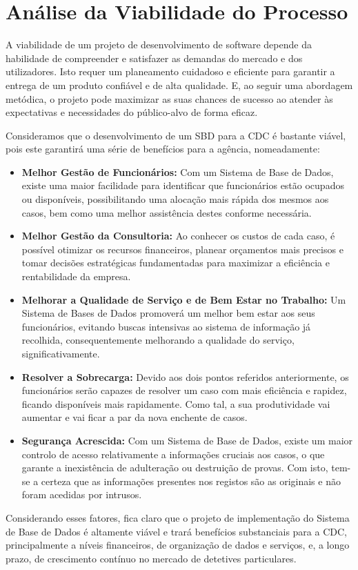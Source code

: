 \documentclass[a4paper,12pt]{scrreprt}
\begin{document}
    \section{Análise da Viabilidade do Processo}
        A viabilidade de um projeto de desenvolvimento de software depende da habilidade de compreender e satisfazer as
        demandas do mercado e dos utilizadores. Isto requer um planeamento cuidadoso e eficiente para garantir a
        entrega de um produto confiável e de alta qualidade. E, ao seguir uma abordagem metódica, o projeto pode
        maximizar as suas chances de sucesso ao atender às expectativas e necessidades do público-alvo de forma eficaz.
        \par Consideramos que o desenvolvimento de um SBD para a CDC é bastante viável, pois este garantirá uma série de benefícios para a agência, nomeadamente:
        \begin{itemize}
            \item \textbf{Melhor Gestão de Funcionários:} Com um Sistema de Base de Dados, existe uma maior facilidade para identificar que funcionários estão ocupados ou disponíveis, possibilitando uma alocação mais rápida dos mesmos aos casos, bem como uma melhor assistência destes conforme necessária.
            \item \textbf{Melhor Gestão da Consultoria:} Ao conhecer os custos de cada caso, é possível otimizar os recursos financeiros, planear orçamentos mais precisos e tomar decisões estratégicas fundamentadas para maximizar a eficiência e rentabilidade da empresa.
            \item \textbf{Melhorar a Qualidade de Serviço e de Bem Estar no Trabalho:} Um Sistema de Bases de Dados
                promoverá um melhor bem estar aos seus funcionários, evitando buscas intensivas ao sistema de
                informação já recolhida, consequentemente melhorando a qualidade do serviço, significativamente.
            \item \textbf{Resolver a Sobrecarga:} Devido aos dois pontos referidos anteriormente, os funcionários
                serão capazes de resolver um caso com mais eficiência e rapidez, ficando disponíveis mais rapidamente.
                Como tal, a sua produtividade vai aumentar e vai ficar a par da nova enchente de casos.
            \item \textbf{Segurança Acrescida:} Com um Sistema de Base de Dados, existe um maior controlo de acesso relativamente a informações cruciais aos casos, o que garante a inexistência de adulteração ou destruição de provas. Com isto, tem-se a certeza que as informações presentes nos registos são as originais e não foram acedidas por intrusos.
        \end{itemize}
        \par Considerando esses fatores, fica claro que o projeto de implementação do Sistema de Base de Dados é
        altamente viável e trará benefícios substanciais para a CDC, principalmente a níveis financeiros, de
        organização de dados e serviços, e, a longo prazo, de crescimento contínuo no mercado de detetives particulares.
\end{document}
